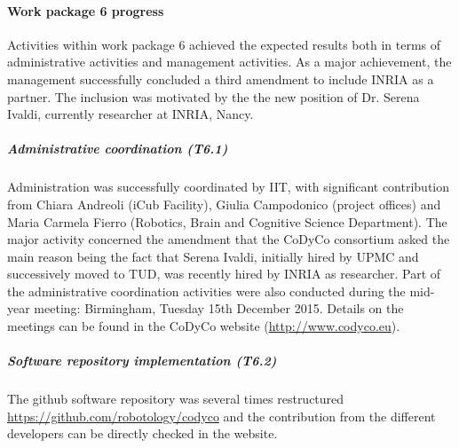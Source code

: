 

\paragraph{Work package 6 progress}

Activities within work package 6 achieved the expected results both in terms of administrative activities and management activities. As a major achievement, the management successfully concluded a third amendment to include INRIA as a partner. The inclusion was motivated by the the new position of Dr. Serena Ivaldi, currently researcher at INRIA, Nancy. 

\subparagraph*{Administrative coordination (T6.1)}
Administration was successfully coordinated by IIT, with significant contribution from Chiara Andreoli (iCub Facility), Giulia Campodonico (project offices) and Maria Carmela Fierro (Robotics, Brain and Cognitive Science Department). The major activity concerned the amendment that the CoDyCo consortium asked the main reason being the fact that Serena Ivaldi, initially hired by UPMC and successively moved to TUD, was recently hired by INRIA as researcher. Part of the administrative coordination activities were also conducted during the mid-year meeting: Birmingham, Tuesday 15th December 2015.  Details on the meetings can be found in the CoDyCo website (\url{http://www.codyco.eu}).

\subparagraph*{Software repository implementation (T6.2)}

The github software repository was several times restructured \url{https://github.com/robotology/codyco} and the contribution from the different developers can be directly checked in the website. 
